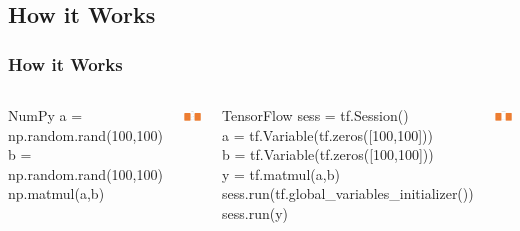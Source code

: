 \documentclass[pdf]{beamer}
\newenvironment{code}{\ttfamily\scriptsize\begin{block}}{\end{block}}
\begin{document}
\subsection{How it Works}
\begin{frame}
  \frametitle{How it Works}
  \begin{columns}

    \begin{code}{NumPy}
      a = np.random.rand(100,100)\\
      b = np.random.rand(100,100)\\
      np.matmul(a,b)\\
    \end{code}
    \begin{center}
      \includegraphics[scale=0.25]{numpy_backend.png}
    \end{center}
    \begin{code}{TensorFlow}
      sess = tf.Session()\\
      a = tf.Variable(tf.zeros([100,100]))\\
      b = tf.Variable(tf.zeros([100,100]))\\
      y = tf.matmul(a,b)\\
      sess.run(tf.global\_variables\_initializer())\\
      sess.run(y)\\
    \end{code}
    \begin{center}
      \includegraphics[scale=0.25]{tf_backend.png}
    \end{center}
  \end{columns}
  
\end{frame}
\end{document}

